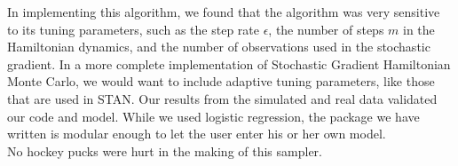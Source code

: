 In implementing this algorithm, we found that the algorithm was very sensitive to its tuning parameters, such as the step rate $\epsilon$, the number of steps $m$ in the Hamiltonian dynamics, and the number of observations used in the stochastic gradient. In a more complete implementation of Stochastic Gradient Hamiltonian Monte Carlo, we would want to include adaptive tuning parameters, like those that are used in STAN. Our results from the simulated and real data validated our code and model. While we used logistic regression, the package we have written is modular enough to let the user enter his or her own model.\\

No hockey pucks were hurt in the making of this sampler.